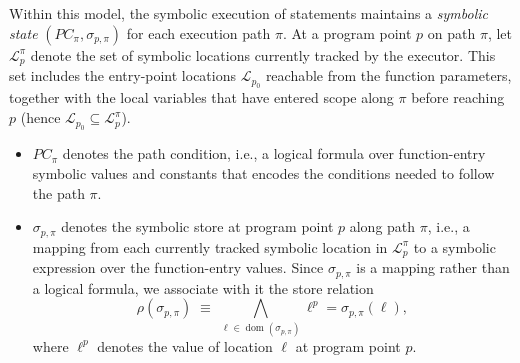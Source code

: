 

Within this model, the symbolic execution of statements maintains a \emph{symbolic state} $(PC_\pi, \sigma_{p,\pi})$ for each execution path $\pi$. 
At a program point $p$ on path $\pi$, let $\mathcal{L}^{\pi}_{p}$ denote the set of symbolic locations currently tracked by the executor. This set includes the entry-point locations $\mathcal{L}_{p_0}$ reachable from the function parameters, together with the local variables that have entered scope along $\pi$ before reaching $p$ (hence $\mathcal{L}_{p_0}\subseteq\mathcal{L}^{\pi}_{p}$). 
\begin{itemize}
\item $PC_\pi$ denotes the path condition, i.e., a logical formula over function-entry symbolic values and constants that encodes the conditions needed to follow the path $\pi$. 
\item $\sigma_{p,\pi}$ denotes the symbolic store at program point $p$
along path $\pi$, i.e., a mapping from each currently tracked symbolic
location in $\mathcal{L}^{\pi}_{p}$ to a symbolic expression over the
function-entry values. {Since $\sigma_{p,\pi}$ is a mapping rather than a
logical formula, we associate with it the store relation
\[
\rho(\sigma_{p,\pi})
  \;\equiv\;
  \bigwedge_{\ell\in\operatorname{dom}(\sigma_{p,\pi})}
  \ell^{p}=\sigma_{p,\pi}(\ell),
\]
where $\ell^{p}$ denotes the value of location $\ell$ at program point
$p$.}
\end{itemize}

